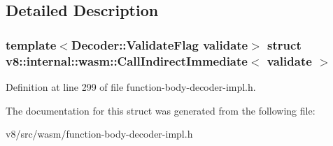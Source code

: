 \subsection{Detailed Description}
\subsubsection*{template$<$Decoder\+::\+Validate\+Flag validate$>$\newline
struct v8\+::internal\+::wasm\+::\+Call\+Indirect\+Immediate$<$ validate $>$}



Definition at line 299 of file function-\/body-\/decoder-\/impl.\+h.



The documentation for this struct was generated from the following file\+:\begin{DoxyCompactItemize}
\item 
v8/src/wasm/function-\/body-\/decoder-\/impl.\+h\end{DoxyCompactItemize}
